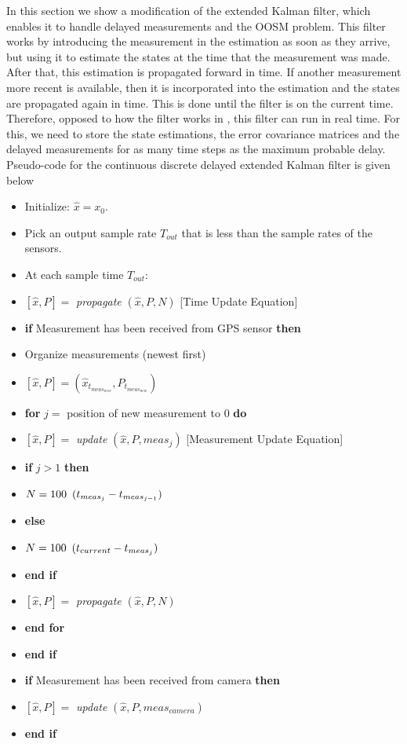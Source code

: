In this section we show a modification of the extended Kalman filter, which enables it to handle delayed measurements and the OOSM problem. This filter works by introducing the measurement in the estimation as soon as they arrive, but using it to estimate the states at the time that the measurement was made. After that, this estimation is propagated forward in time. If another measurement more recent is available, then it is incorporated into the estimation and the states are propagated again in time. This is done until the filter is on the current time. Therefore, opposed to how the filter works in \cite{Nettleton2001}, this filter can run in real time. For this, we need to store the state estimations, the error covariance matrices and the delayed measurements for as many time steps as the maximum probable delay. \linebreak \linebreak
Pseudo-code for the continuous discrete delayed extended Kalman filter is given below
\renewcommand{\labelitemi}{$\cdot$}
\begin{itemize}[nosep]
\item Initialize: $ \hat{x}=x_0 $.
\item Pick an output sample rate $T_{out}$ that is less than the sample rates of the sensors.
\item At each sample time $T_{out}$:
\item $ [\hat{x},P]=$ \textit{propagate} $(\hat{x},P,N)$ [Time Update Equation]
\item \textbf{if} Measurement has been received from GPS sensor \textbf{then} 
\item \quad Organize measurements (newest first)
\item \quad $[\hat{x},P]=(\hat{x}_{t_{{meas}_{new}}},P_{t_{{meas}_{new}}})$
\item \quad \textbf{for} $j=$ position of new measurement to $0$ \textbf{do}
\item \qquad $[\hat{x},P]=$ \textit{update} $(\hat{x},P,meas_j)$ [Measurement Update Equation]
\item \qquad \textbf{if} $j>1$ \textbf{then}
\item \qquad \quad $N=100\enskip(t_{{meas}_j}-t_{{meas}_{j-1}})$
\item \qquad \textbf{else}
\item \qquad \quad $N=100\enskip(t_{current}-t_{{meas}_j})$
\item \qquad \textbf{end if}
\item \qquad $[\hat{x},P]=$ \textit{propagate} $(\hat{x},P,N)$
\item \quad \textbf{end for}
\item \textbf{end if}

\item \textbf{if} Measurement has been received from camera \textbf{then} 
\item \quad $[\hat{x},P]=$ \textit{update} $(\hat{x},P,meas_{camera})$
\item \textbf{end if}
\end{itemize}
